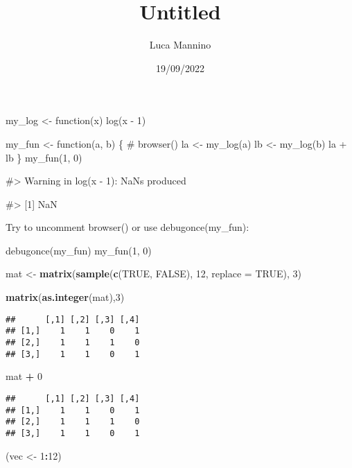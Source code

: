 \documentclass[]{article}
\title{Untitled}
\author{Luca Mannino}
\date{19/09/2022}
\newenvironment{Shaded}{\begin{snugshade}}{\end{snugshade}}
\newcommand{\DataTypeTok}[1]{\textcolor[rgb]{0.13,0.29,0.53}{#1}}
\newcommand{\DecValTok}[1]{\textcolor[rgb]{0.00,0.00,0.81}{#1}}
\newcommand{\KeywordTok}[1]{\textcolor[rgb]{0.13,0.29,0.53}{\textbf{#1}}}
\newcommand{\NormalTok}[1]{#1}
\newcommand{\OperatorTok}[1]{\textcolor[rgb]{0.81,0.36,0.00}{\textbf{#1}}}
\newcommand{\OtherTok}[1]{\textcolor[rgb]{0.56,0.35,0.01}{#1}}
\newcommand{\StringTok}[1]{\textcolor[rgb]{0.31,0.60,0.02}{#1}}
\begin{document}
\maketitle

my\_log \textless{}- function(x) log(x - 1)

my\_fun \textless{}- function(a, b) \{ \# browser() la \textless{}-
my\_log(a) lb \textless{}- my\_log(b) la + lb \} my\_fun(1, 0)

\#\textgreater{} Warning in log(x - 1): NaNs produced

\#\textgreater{} {[}1{]} NaN

Try to uncomment browser() or use debugonce(my\_fun):

debugonce(my\_fun) my\_fun(1, 0)

\begin{Shaded}
\begin{Highlighting}[]
\NormalTok{mat <-}\StringTok{ }\KeywordTok{matrix}\NormalTok{(}\KeywordTok{sample}\NormalTok{(}\KeywordTok{c}\NormalTok{(}\OtherTok{TRUE}\NormalTok{, }\OtherTok{FALSE}\NormalTok{), }\DecValTok{12}\NormalTok{, }\DataTypeTok{replace =} \OtherTok{TRUE}\NormalTok{), }\DecValTok{3}\NormalTok{)}
\end{Highlighting}
\end{Shaded}

\begin{Shaded}
\begin{Highlighting}[]
\KeywordTok{matrix}\NormalTok{(}\KeywordTok{as.integer}\NormalTok{(mat),}\DecValTok{3}\NormalTok{)}
\end{Highlighting}
\end{Shaded}

\begin{verbatim}
##      [,1] [,2] [,3] [,4]
## [1,]    1    1    0    1
## [2,]    1    1    1    0
## [3,]    1    1    0    1
\end{verbatim}

\begin{Shaded}
\begin{Highlighting}[]
\NormalTok{mat }\OperatorTok{+}\StringTok{ }\DecValTok{0}
\end{Highlighting}
\end{Shaded}

\begin{verbatim}
##      [,1] [,2] [,3] [,4]
## [1,]    1    1    0    1
## [2,]    1    1    1    0
## [3,]    1    1    0    1
\end{verbatim}

\begin{Shaded}
\begin{Highlighting}[]
\NormalTok{(vec <-}\StringTok{ }\DecValTok{1}\OperatorTok{:}\DecValTok{12}\NormalTok{)}
\end{Highlighting}
\end{Shaded}
\end{document}
